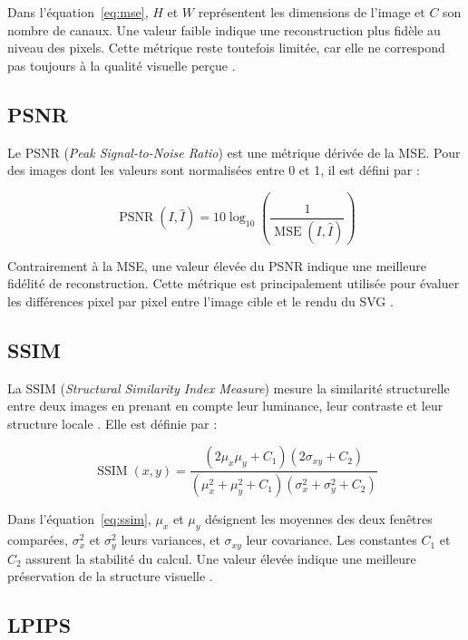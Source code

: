 \documentclass[12pt, a4paper, oneside]{report}
\begin{document}
Dans l'équation~\eqref{eq:mse}, $H$ et $W$ représentent les dimensions de l'image et $C$ son nombre de canaux. Une valeur faible indique une reconstruction plus fidèle au niveau des pixels. Cette métrique reste toutefois limitée, car elle ne correspond pas toujours à la qualité visuelle perçue \cite{ma2022live,hu2024supersvg}.

\subsection{PSNR}

Le PSNR (\textit{Peak Signal-to-Noise Ratio}) est une métrique dérivée de la MSE. Pour des images dont les valeurs sont normalisées entre 0 et 1, il est défini par :

\begin{equation}
    \operatorname{PSNR}(I,\hat{I}) =
    10\log_{10}
    \left(
    \frac{1}{\operatorname{MSE}(I,\hat{I})}
    \right)
    \label{eq:psnr}
\end{equation}

Contrairement à la MSE, une valeur élevée du PSNR indique une meilleure fidélité de reconstruction. Cette métrique est principalement utilisée pour évaluer les différences pixel par pixel entre l'image cible et le rendu du SVG \cite{li2020diffvg,hu2024supersvg}.

\subsection{SSIM}

La SSIM (\textit{Structural Similarity Index Measure}) mesure la similarité structurelle entre deux images en prenant en compte leur luminance, leur contraste et leur structure locale \cite{wang2004ssim}. Elle est définie par :

\begin{equation}
    \operatorname{SSIM}(x,y) =
    \frac{
    (2\mu_x\mu_y+C_1)(2\sigma_{xy}+C_2)
    }{
    (\mu_x^2+\mu_y^2+C_1)
    (\sigma_x^2+\sigma_y^2+C_2)
    }
    \label{eq:ssim}
\end{equation}

Dans l'équation~\eqref{eq:ssim}, $\mu_x$ et $\mu_y$ désignent les moyennes des deux fenêtres comparées, $\sigma_x^2$ et $\sigma_y^2$ leurs variances, et $\sigma_{xy}$ leur covariance. Les constantes $C_1$ et $C_2$ assurent la stabilité du calcul. Une valeur élevée indique une meilleure préservation de la structure visuelle \cite{hu2024supersvg}.

\subsection{LPIPS}
\end{document}
